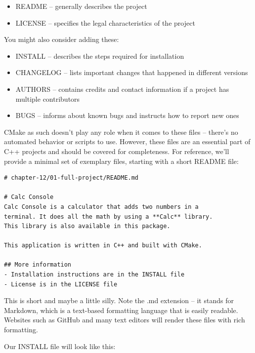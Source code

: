 \begin{itemize}
\item 
README – generally describes the project

\item 
LICENSE – specifies the legal characteristics of the project
\end{itemize}

You might also consider adding these:

\begin{itemize}
\item 
INSTALL – describes the steps required for installation

\item 
CHANGELOG – lists important changes that happened in different versions

\item 
AUTHORS – contains credits and contact information if a project has multiple contributors

\item 
BUGS – informs about known bugs and instructs how to report new ones
\end{itemize}

CMake as such doesn't play any role when it comes to these files – there's no automated behavior or scripts to use. However, these files are an essential part of C++ projects and should be covered for completeness. For reference, we'll provide a minimal set of exemplary files, starting with a short README file:

\begin{lstlisting}[style=stylePython]
# chapter-12/01-full-project/README.md

# Calc Console
Calc Console is a calculator that adds two numbers in a
terminal. It does all the math by using a **Calc** library.
This library is also available in this package.

This application is written in C++ and built with CMake.

## More information
- Installation instructions are in the INSTALL file
- License is in the LICENSE file
\end{lstlisting}

This is short and maybe a little silly. Note the .md extension – it stands for Markdown, which is a text-based formatting language that is easily readable. Websites such as GitHub and many text editors will render these files with rich formatting.

Our INSTALL file will look like this:

